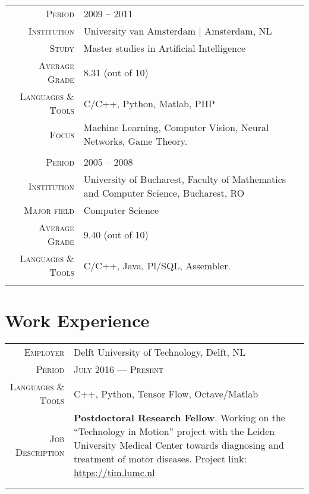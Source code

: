 \documentclass[a4paper, oneside, final]{scrartcl}
\newcommand{\gray}{\rowcolor[gray]{.90}}
\begin{document}
\begin{center}
\begin{tabular}{r@{\hskip 0.3in}p{11.3cm}}
			\gray \textsc{Period}       & \textsc{2009  -- 2011}\\
			\textsc{Institution}        & University van Amsterdam $\mid$ Amsterdam, NL\\
			\textsc{Study}              & Master studies in Artificial Intelligence\\
			\textsc{Average Grade}      & 8.31 (out of 10)\\
			\textsc{Languages \& Tools} & C\slash C++, Python, Matlab, PHP\\
			\textsc{Focus}              & Machine Learning, Computer Vision, Neural Networks, Game Theory.\\ 
			\multicolumn{2}{c}{}\\
	
			\gray \textsc{Period}       & \textsc{2005 -- 2008}\\
			\textsc{Institution}        & University of Bucharest, Faculty of Mathematics 
				and Computer Science, Bucharest, RO\\
			\textsc{Major field}        & Computer Science\\	
			\textsc{Average Grade}      & 9.40 (out of 10)\\
			\textsc{Languages \& Tools} & C\slash C++, Java, Pl\slash SQL, Assembler.\\ 
			\multicolumn{2}{c}{}\\
		\end{tabular}

		\section{Work Experience}
		\begin{tabular}{r@{\hskip 0.3in}p{11.3cm}}
			\gray \textsc{Employer}     & Delft University of Technology, Delft, NL\\
			\textsc{Period}             & \textsc{July 2016 --- Present} \\
			\textsc{Languages \& Tools} & C++, Python, Tensor Flow, Octave\slash Matlab\\
			\textsc{Job Description}    & \textbf{Postdoctoral Research Fellow}. 
				Working on the ``Technology in Motion'' project with the Leiden University Medical Center 
				towards diagnosing and treatment of motor diseases.
				Project link: \href{https://tim.lumc.nl}{https://tim.lumc.nl}\\
			\multicolumn{2}{c}{}\\
			\multicolumn{2}{c}{}\\ %


\end{tabular}
\end{center}
\end{document}
